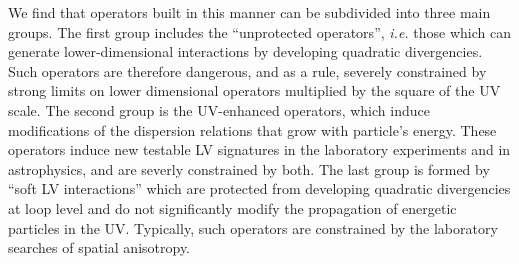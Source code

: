\documentclass[12pt,preprintnumbers,nofootinbib]{revtex4}
\begin{document}
	We find that operators built in this manner can be 
	subdivided into three main groups.
	The first group includes the ``unprotected operators'', {\it i.e.} those which can
	generate lower-dimensional interactions by developing quadratic divergencies.
	Such operators are therefore dangerous, and as a rule,  severely constrained
	by strong limits on lower dimensional operators multiplied
	by the square of the UV scale.
	The second group is the UV-enhanced operators, which induce modifications of  
the dispersion relations that grow with particle's energy. These operators induce new 
testable LV signatures in the laboratory experiments and in astrophysics, and are severly 
constrained by both.
	The last group is formed by ``soft LV interactions'' which are protected from 
    developing quadratic divergencies at loop level and do not significantly modify the 
	propagation of energetic particles in the UV.  Typically, such operators are constrained 
     by the laboratory searches of spatial anisotropy.
	
	



\end{document}
